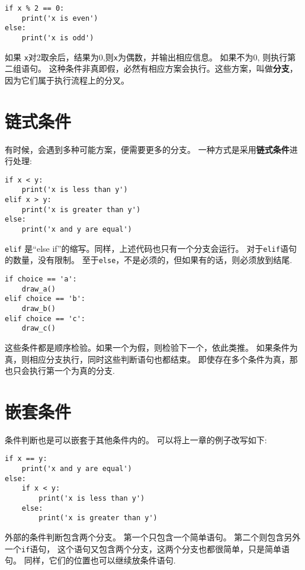 \documentclass[10pt]{book}
\begin{document}
\begin{verbatim}
if x % 2 == 0:
    print('x is even')
else:
    print('x is odd')
\end{verbatim}
%
如果 {\tt x}对2取余后，结果为0,则{\tt x}为偶数，并输出相应信息。
如果不为0, 则执行第二组语句。
这种条件非真即假，必然有相应方案会执行。这些方案，叫做{\bf 分支}，
因为它们属于执行流程上的分叉。



\section{链式条件}
有时候，会遇到多种可能方案，便需要更多的分支。
一种方式是采用{\bf 链式条件}进行处理:

\begin{verbatim}
if x < y:
    print('x is less than y')
elif x > y:
    print('x is greater than y')
else:
    print('x and y are equal')
\end{verbatim}
%
{\tt elif}  是``else if''的缩写。同样，上述代码也只有一个分支会运行。
对于{\tt elif}语句的数量，没有限制。
至于{\tt else}，不是必须的，但如果有的话，则必须放到结尾.

\begin{verbatim}
if choice == 'a':
    draw_a()
elif choice == 'b':
    draw_b()
elif choice == 'c':
    draw_c()
\end{verbatim}
%
这些条件都是顺序检验。如果一个为假，则检验下一个，依此类推。
如果条件为真，则相应分支执行，同时这些判断语句也都结束。
即使存在多个条件为真，那也只会执行第一个为真的分支.  


\section{嵌套条件}

条件判断也是可以嵌套于其他条件内的。
可以将上一章的例子改写如下:

\begin{verbatim}
if x == y:
    print('x and y are equal')
else:
    if x < y:
        print('x is less than y')
    else:
        print('x is greater than y')
\end{verbatim}
%
外部的条件判断包含两个分支。
第一个只包含一个简单语句。
第二个则包含另外一个{\tt if}语句，
这个语句又包含两个分支，这两个分支也都很简单，只是简单语句。
同样，它们的位置也可以继续放条件语句.
\end{document}

